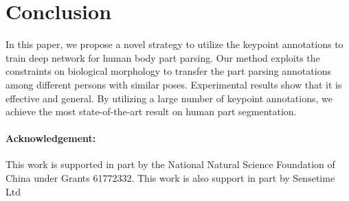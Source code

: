 \documentclass[10pt,twocolumn,letterpaper]{article}
\begin{document}
\section{Conclusion}
\vspace{-2mm}
In this paper, we propose a novel strategy to utilize the keypoint annotations to train deep network for human body part parsing. Our method exploits the constraints on biological morphology to transfer the part parsing annotations among different persons with similar poses. Experimental results show that it is effective and general. By utilizing a large number of keypoint annotations, we achieve the most state-of-the-art result on human part segmentation.
\vspace{-3mm}
{\small
\paragraph{Acknowledgement:} This work is supported in part by the National Natural Science Foundation of China under Grants 61772332. This work is also support in part by Sensetime Ltd
}
{\small


}
\end{document}
